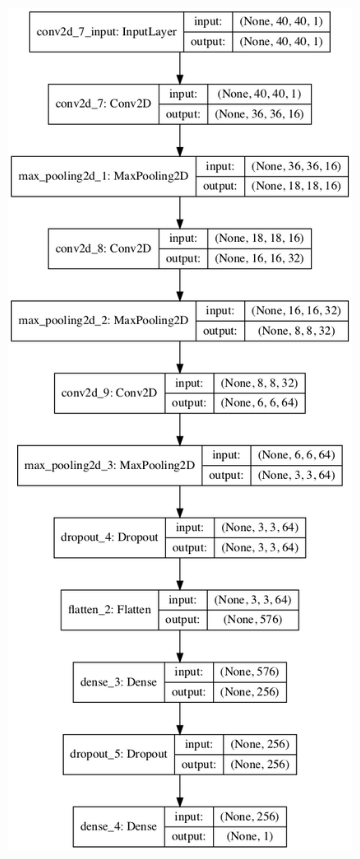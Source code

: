 \documentclass[a4paper,fleqn,usenatbib]{mnras}
\begin{document}
\begin{figure}
 \begin{subfigure}{0.8\columnwidth}
 \includegraphics[width=\columnwidth]{../Figures/CNN_model_self} 

\end{subfigure}
\end{figure}
\end{document}
